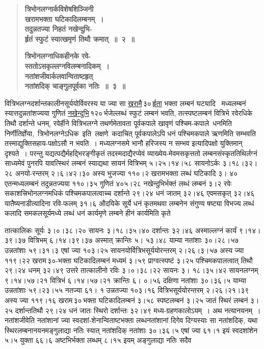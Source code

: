\documentclass[11pt, openany]{book}
\begin{document}
 \label{5.2}
\begin{quote}
{\large \textbf{{\color{purple}त्रिभोनलग्नार्कविशेषशिञ्जिनी \\
खरामभक्ता घटिकादिलम्बनम्~। \\
तदुन्नतज्या निहतं नखेन्दुभि-\\
र्हृतं स्फुटं स्यात्खमृणं तिथौ क्रमात्~॥~२~॥}}
\vspace{1mm}

 \label{5.3}
\textbf{{\color{purple}त्रिभोनलग्नाधिकहीनके रवे-\\
स्ततोऽसकृल्लग्नविलम्बनादिकम्~। \\
नतांशजीवार्कलवान्विताष्टहृत् \\
नतांशदिक् चाङ्गुलपूर्वका नतिः~॥~३~॥}}}
\end{quote}

\newpage

वित्रिभलग्नदर्शान्तकालीनसूर्ययोर्विवरस्य या ज्या सा \hyperref[5.2]{खरामै}\textendash \,३०\textendash \,\hyperref[5.2]{र्हृता} भक्ता लम्बनं घट्यादि ~मध्यलम्बनं स्यात्तदुन्नतांशज्यया गुणितं \hyperref[5.2]{नखेन्दुभि}\textendash \,१२०\textendash \,र्भजेल्लब्धं स्फुटं लम्बनं भवति, तत्स्पष्टलम्बनं वित्रिभे रवेरधिके तिथौ दर्शान्ते धनम्, रवेर्हीने वित्रिभलग्ने तथर्णमेतावता पूर्वकपाले खावृणं पश्चिम-कपाले \,धनमिति \,निर्णीतिर्ज्ञेया, \,त्रिभोनलग्नेऽधिक \,इति \,लक्षणे \,कदाचित् पूर्वकपालेऽपि \;धनं \;पश्चिमकपाले \;ऋणमिति \;सम्भवति \;तस्माद्युक्तिसहाय-पक्षोऽसौ न भवति~। मध्यलग्नसमे भानौ हरिजस्य न सम्भव इत्यादिपक्षो युक्तिमान् दृश्यते~। परन्तु यद्यत्पद्यैर्महद्भिरङ्गीकृतं तदस्मदाद्यैरप्येवं व्याख्येय-मेवमसकृत्ततो लम्बनसंस्कृततिथिर्लग्नं साध्यमेवं पुनरपि यावत्स्थिरं लम्बनं स्याद्यथा सायनं वित्रिभम् ५।२५।१४।५८ सायनोऽर्कः ३।१८।३२।२८ अनयो-रन्तरम् २।६।४२।३० अस्य भुजज्या ११०।२ खरामभक्ता लब्धं घटिकादि ३। ४० एतन्मध्यलम्बनं तदुन्नतज्यया ११०।३५ गुणितं ४०५।२८ नखेन्दुभिर्भक्तं लब्धं लम्बनं ३।२ रवेः सकाशत्त्रिभोनलग्नमधिकं पश्चिमकपालत्वाच्च दर्शान्ते २९।२४ धनं जातम् ३२।४६ एवमसकृत् ३२।४६ यातैष्यनाडीत्यादिना रवि-फलम् ३१।६ औदयिके सूर्ये धनं कृतमथवा लम्बनेन संगुण्य षष्ट्या विभज्य लब्धं कलादि समकलसूर्यमध्ये लब्धं धनं कार्यमृणे लम्बने हीनं कार्यमिति कृते

\newpage

\noindent तात्कालिकः \;सूर्यः \;३।०।३८।२० \;सायनः \;३।१८।३५।४० \;दर्शान्तः \;३२।४६ अस्माल्लग्नं कार्यं ९।१४।३९।३७ वित्रिभम् ६।१४।३९।३७ अस्मात् क्रान्तिः ५। ५३।४८ याम्या नतांशाः ३०।२८।५७ उन्नतांशाः ५९।३१।३ एषां ज्या १०३।२५ सायनयोर्वित्रिभसूर्ययोरन्तरम् २।२६।३।५७ अस्य ज्या ११९।२२ खराम\textendash \,३०-भक्ता घटिकादिलम्बनं मध्यमं ३।५९ प्राग्वत्स्पष्टं ३।२५ पश्चिमकपालत्वात् तिथौ २९।२४ धनम् ३२।४९ उत्तरे तात्कालीनो रविः ३।०।३८।२२ सायनः ३। १८।३५।४२ सायनलग्नम् ९।१४।५७।२१ वित्रिभं ६।१४।५७।२१ क्रान्तिः ६। ०।५६ दक्षिणा नतांशाः ३०।३६।५ याम्या उन्नतांशाः ५९।२३।५५ नतज्या ६१। १ उन्नतज्या १०३।१६ वित्रिभसूर्ययोरन्तरम् २।२६।२१।३९ अस्य ज्या ११९।१६ खराम\textendash \,३०\textendash \,भक्ता \;घटिकादिलम्बनं \;३।५८ \;स्पष्टलम्बनं \;३।२५ \;जातं \;स्थिरं लम्बनं ३।२५ दर्शान्ततिथौ २९।२४ धनं जातः स्थिरो दर्शान्तः ३२।४९ मध्य-ग्रहणकालोऽयम्~। अथ नत्यानयनम्~। नतांशजीवेति नतांशानां ज्या स्वदशां-शेनान्विताष्टभक्ता \;लब्धनतांशानां \;दिगेव \;दिग्यस्याः \;सा \;नतांशदिक्, \;यथा स्थिरलम्बनानयनमङ्गुलाद्या नतिः स्यात् नतांशदिक् नतांशाः ३०।३६।५ एषां ज्या ६१।१ इयं स्वदशांशेन ५।५ युक्ता ६६।६ अष्टभिर्भक्ता लब्धम् ८।१५ इयम् अङ्गुलाद्या नतिः सदैव
\end{document}
